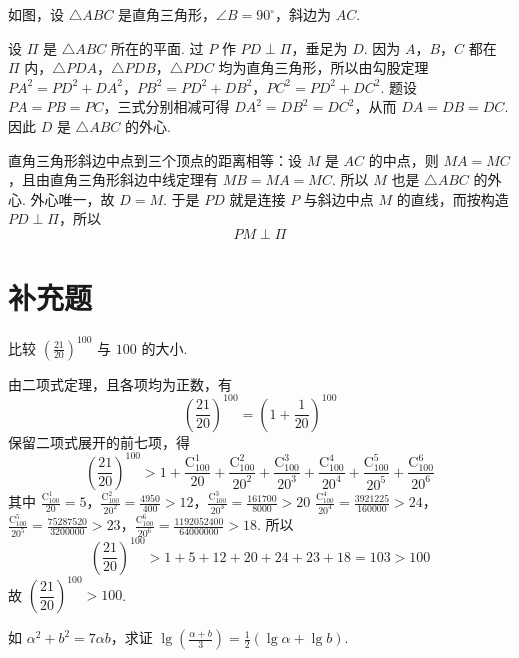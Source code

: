\begin{solution}
如图，设 \(\triangle ABC\) 是直角三角形，\(\angle B=90^\circ\)，斜边为 \(AC\).


设 \(\Pi\) 是 \(\triangle ABC\) 所在的平面. 过 \(P\) 作 \(PD\perp\Pi\)，垂足为 \(D\). 因为 \(A\)，\(B\)，\(C\) 都在 \(\Pi\) 内，\(\triangle PDA\)，\(\triangle PDB\)，\(\triangle PDC\) 均为直角三角形，所以由勾股定理
\(PA^2=PD^2+DA^2\)，\(PB^2=PD^2+DB^2\)，\(PC^2=PD^2+DC^2\).
题设 \(PA=PB=PC\)，三式分别相减可得 \(DA^2=DB^2=DC^2\)，从而 \(DA=DB=DC\). 因此 \(D\) 是 \(\triangle ABC\) 的外心.

直角三角形斜边中点到三个顶点的距离相等：设 \(M\) 是 \(AC\) 的中点，则 \(MA=MC\)，且由直角三角形斜边中线定理有 \(MB=MA=MC\). 所以 \(M\) 也是 \(\triangle ABC\) 的外心. 外心唯一，故 \(D=M\). 于是 \(PD\) 就是连接 \(P\) 与斜边中点 \(M\) 的直线，而按构造 \(PD\perp\Pi\)，所以
\[
PM\perp\Pi
\]
\end{solution}

\section{补充题}

\begin{problem}
比较 \(\left( \frac{21}{20} \right)^{100}\) 与 \(100\) 的大小.
\end{problem}

\begin{solution}
由二项式定理，且各项均为正数，有
\[
\left(\frac{21}{20}\right)^{100}
=\left(1+\frac1{20}\right)^{100}
\]
保留二项式展开的前七项，得
\[
\left(\frac{21}{20}\right)^{100}
>1+\frac{\mathrm C_{100}^{1}}{20}+\frac{\mathrm C_{100}^{2}}{20^2}+\frac{\mathrm C_{100}^{3}}{20^3}+\frac{\mathrm C_{100}^{4}}{20^4}+\frac{\mathrm C_{100}^{5}}{20^5}+\frac{\mathrm C_{100}^{6}}{20^6}
\]
其中
\(\frac{\mathrm C_{100}^{1}}{20}=5\)，\(\frac{\mathrm C_{100}^{2}}{20^2}=\frac{4950}{400}>12\)，\(\frac{\mathrm C_{100}^{3}}{20^3}=\frac{161700}{8000}>20\)
\(\frac{\mathrm C_{100}^{4}}{20^4}=\frac{3921225}{160000}>24\)，\(\frac{\mathrm C_{100}^{5}}{20^5}=\frac{75287520}{3200000}>23\)，\(\frac{\mathrm C_{100}^{6}}{20^6}=\frac{1192052400}{64000000}>18\).
所以
\[
\left(\frac{21}{20}\right)^{100}>1+5+12+20+24+23+18=103>100
\]
故 \(\left(\dfrac{21}{20}\right)^{100}>100\).
\end{solution}

\begin{problem}
如 \(\alpha^{2}+b^{2}=7\alpha b\)，求证 \(\lg\left( \frac{\alpha+b}{3} \right)=\frac{1}{2}\left( \lg\alpha+\lg b \right)\).
\end{problem}


